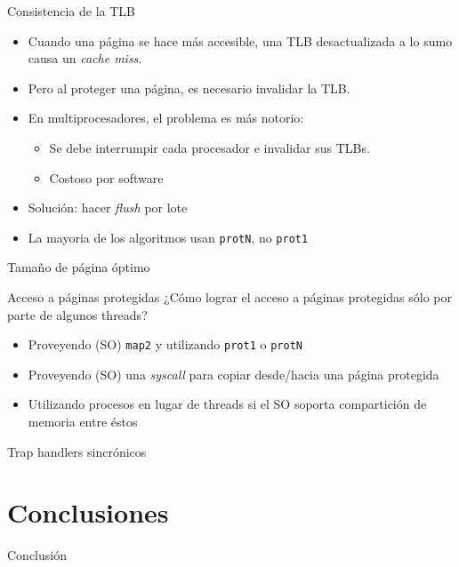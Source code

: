 \documentclass[xcolor=pdftex,dvipsnames,usenames,table]{beamer}
\begin{document}
\begin{frame}{Consistencia de la TLB}
  \begin{itemize}
    \item Cuando una página se hace más accesible, una TLB desactualizada a lo
          sumo causa un \textit{cache miss}.
    \item Pero al proteger una página, es necesario invalidar la TLB.
    \item En multiprocesadores, el problema es más notorio:
    \begin{itemize}
      \item Se debe interrumpir cada procesador e invalidar sus TLBs.
      \item Costoso por software
    \end{itemize}
    \item Solución: hacer \textit{flush} por lote
    \item La mayoria de los algoritmos usan \texttt{protN}, no \texttt{prot1}
  \end{itemize}
\end{frame}

\begin{frame}{Tamaño de página óptimo}
\end{frame}

\begin{frame}{Acceso a páginas protegidas}
\pause ¿Cómo lograr el acceso a páginas protegidas sólo por parte de algunos threads?

\pause
\begin{itemize}
	\item Proveyendo (SO) \texttt{map2} y utilizando \texttt{prot1} o \texttt{protN}
	\item Proveyendo (SO) una \emph{syscall} para copiar desde/hacia una página protegida
	\item Utilizando procesos en lugar de threads si el SO soporta compartición de memoria entre éstos
	
\end{itemize}

\end{frame}

\begin{frame}{Trap handlers sincrónicos}
\end{frame}

\section{Conclusiones}

\begin{frame}{Conclusión}
\end{frame}
\end{document}
